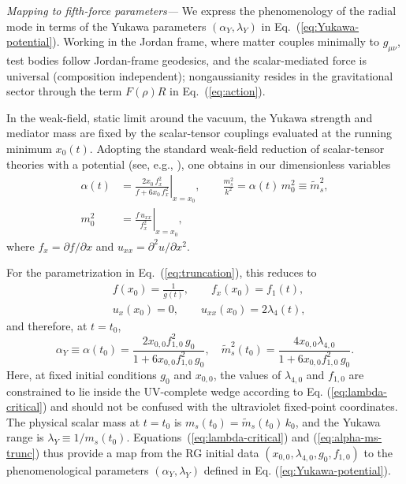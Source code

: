 \documentclass[reprint,superscriptaddress,amsmath,amssymb,aps,prl,floatfix]{revtex4-2}
\def\paragraph#1{
   \textit{#1}
  \unskip
}
\newcommand{\alphay}{\alpha_Y}
\newcommand{\lamy}{\lambda_Y}
\begin{document}
\paragraph{Mapping to fifth-force parameters—}We express the phenomenology of the radial mode in terms of the Yukawa parameters $(\alphay,\lamy)$ in Eq.~(\ref{eq:Yukawa-potential}). Working in the Jordan frame, where matter couples minimally to $g_{\mu\nu}$, test bodies follow Jordan-frame geodesics, and the scalar-mediated force is universal (composition independent); nongaussianity resides in the gravitational sector through the term $F(\rho)R$ in Eq.~(\ref{eq:action}).

In the weak-field, static limit around the vacuum, the Yukawa strength and mediator mass are fixed by the scalar-tensor couplings evaluated at the running minimum $x_0(t)$. Adopting the standard weak-field reduction of scalar-tensor theories with a potential (see, e.g., \cite{Zhang:2023nil}), one obtains in our dimensionless variables
\begin{equation}\begin{split}
\alpha(t)
&=\left.\frac{2x_0\,f_x^2}{f+6x_0\,f_x^2}\right|_{x=x_0},
\qquad
\frac{m_s^2}{k^2}=\alpha(t)\,m_0^2 \equiv \tilde m_s^2,\\
m_0^2
&=\left.\frac{f\,u_{xx}}{f_x^2}\right|_{x=x_0},
\end{split}\label{eq:alpha-ms-general}
\end{equation}
where $f_x=\partial f/\partial x$ and $u_{xx}=\partial^2 u/\partial x^2$.

For the parametrization in Eq.~(\ref{eq:truncation}), this reduces to
\begin{equation}\begin{split}
&f(x_0)=\frac{1}{g(t)},\qquad f_x(x_0)=f_{1}(t),\\
&u_x(x_0)=0,\qquad u_{xx}(x_0)=2\lambda_{4}(t),
\end{split}\end{equation}
and therefore, at $t=t_0$,
\begin{equation}
\alpha_{Y}\equiv \alpha(t_0)
=\frac{2x_{0,0} f_{1,0}^2\,g_0}{1+6x_{0,0} f_{1,0}^2\,g_0},
\quad
\tilde m_s^{2}(t_0)
=\frac{4x_{0,0} \lambda_{4,0}}{1+6x_{0,0} f_{1,0}^2\,g_0}.
\label{eq:alpha-ms-trunc}
\end{equation}
Here, at fixed initial conditions $g_0$ and $x_{0,0}$, the values of $\lambda_{4,0}$ and $f_{1,0}$ are constrained to lie inside the UV-complete wedge according to Eq. (\ref{eq:lambda-critical}) and should not be confused with the ultraviolet fixed-point coordinates. The physical scalar mass at $t=t_0$ is $m_s(t_0)=\tilde m_s(t_0)\,k_0$, and the Yukawa range is $\lambda_{Y} \equiv 1/m_s(t_0)$. Equations~(\ref{eq:lambda-critical}) and (\ref{eq:alpha-ms-trunc}) thus provide a map from the RG initial data $(x_{0,0},\lambda_{4,0},g_0,f_{1,0})$ to the phenomenological parameters $(\alpha_{Y},\lambda_{Y})$ defined in Eq. (\ref{eq:Yukawa-potential}).
\end{document}
